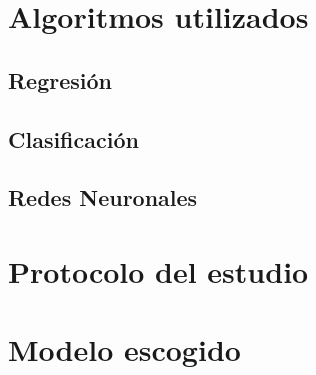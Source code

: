 \section{Algoritmos utilizados}
\label{makereference3.3}
	\subsection{Regresión}
	\subsection{Clasificación}
	\subsection{Redes Neuronales}
	
\section{Protocolo del estudio}
\label{makereference3.4}

\section{Modelo escogido}
\label{makereference3.5}
